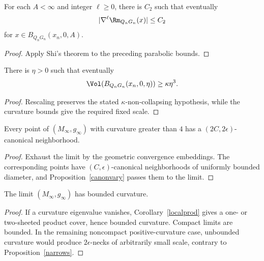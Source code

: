 \begin{corollary}
\label{cor:shi-bound-blowup-sequence}
For each $A<\infty$ and integer $\ell\ge0$, there is $C_2$ such that
eventually
$$|\nabla^\ell\Rm_{Q_nG_n}(x)|\le C_2$$
for $x\in B_{Q_nG_n}(x_n,0,A)$.
\end{corollary}
\begin{proof}\sketch Apply Shi's theorem to the preceding parabolic bounds.\end{proof}

\begin{claim}
\label{claim:volume-noncollapsing-blowup}
There is $\eta>0$ such that eventually
$$\Vol(B_{Q_nG_n}(x_n,0,\eta))\ge\kappa\eta^3.$$
\end{claim}
\begin{proof}\sketch Rescaling preserves the stated $\kappa$-non-collapsing
hypothesis, while the curvature bounds give the required fixed scale.\end{proof}

\begin{claim}
\label{claim:canonical-neighborhood-persists}
Every point of $(M_\infty,g_\infty)$ with curvature greater than $4$ has a
$(2C,2\epsilon)$-canonical neighborhood.
\end{claim}
\begin{proof}
\sketch Exhaust the limit by the geometric convergence embeddings. The
corresponding points have $(C,\epsilon)$-canonical neighborhoods of uniformly
bounded diameter, and Proposition~\ref{canonvary} passes them to the limit.\end{proof}

\begin{claim}
\label{claim:limit-bounded-curvature}
The limit $(M_\infty,g_\infty)$ has bounded curvature.
\end{claim}
\begin{proof}
\sketch If a curvature eigenvalue vanishes, Corollary~\ref{localprod} gives a
one- or two-sheeted product cover, hence bounded curvature. Compact limits are
bounded. In the remaining noncompact positive-curvature case, unbounded
curvature would produce $2\epsilon$-necks of arbitrarily small scale, contrary
to Proposition~\ref{narrows}.\end{proof}

